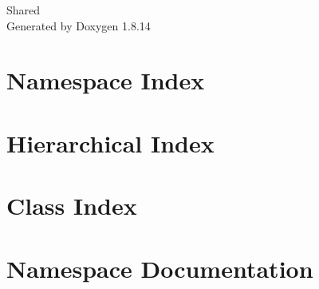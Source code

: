 \documentclass[twoside]{book}
\newcommand{\+}{\discretionary{\mbox{\scriptsize$\hookleftarrow$}}{}{}}
\newcommand{\clearemptydoublepage}{%
  \newpage{\pagestyle{empty}\cleardoublepage}%
}
\begin{document}
\hypersetup{pageanchor=false,
             bookmarksnumbered=true,
             pdfencoding=unicode
            }
\begin{titlepage}
\vspace*{7cm}
\begin{center}%
{\Large Shared }\\
\vspace*{1cm}
{\large Generated by Doxygen 1.8.14}\\
\end{center}
\end{titlepage}
\clearemptydoublepage
{}
\tableofcontents
\clearemptydoublepage
{}
\hypersetup{pageanchor=true}

\chapter{Namespace Index}

\chapter{Hierarchical Index}

\chapter{Class Index}

\chapter{Namespace Documentation}



















\end{document}
